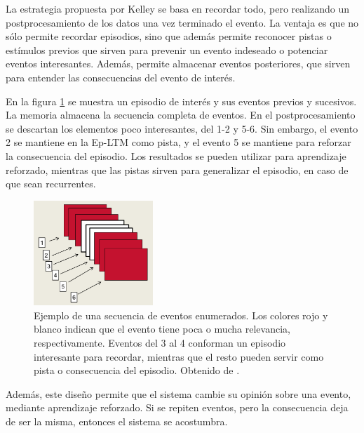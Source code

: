 La estrategia propuesta por Kelley se basa en recordar todo, pero realizando un postprocesamiento de los datos una vez terminado el evento. La ventaja es que no sólo permite recordar episodios, sino que además permite reconocer pistas o estímulos previos que sirven para prevenir un evento indeseado o potenciar eventos interesantes. Además, permite almacenar eventos posteriores, que sirven para entender las consecuencias del evento de interés. 

En la figura \ref{img:sleep_eventos} se muestra un episodio de interés y sus eventos previos y sucesivos. La memoria almacena la secuencia completa de eventos. En el postprocesamiento se descartan los elementos poco interesantes, del 1-2 y 5-6. Sin embargo, el evento 2 se mantiene en la Ep-LTM como pista, y el evento 5 se mantiene para reforzar la consecuencia del episodio. Los resultados se pueden utilizar para aprendizaje reforzado, mientras que las pistas sirven para generalizar el episodio, en caso de que sean recurrentes.

\begin{figure}[H]
\centering
\includegraphics[width=0.4\textwidth]{./figures/eventos.png}
\caption{\small Ejemplo de una secuencia de eventos enumerados. Los colores rojo y blanco indican que el evento tiene poca o mucha relevancia, respectivamente. Eventos del 3 al 4 conforman un episodio interesante para recordar, mientras que el resto pueden servir como pista o consecuencia del episodio. Obtenido de \cite{Kelley2014}.}
\label{img:sleep_eventos}
\end{figure}







Además, este diseño permite que el sistema cambie su opinión sobre una evento, mediante aprendizaje reforzado. Si se repiten eventos, pero la consecuencia deja de ser la misma, entonces el sistema se acostumbra.

